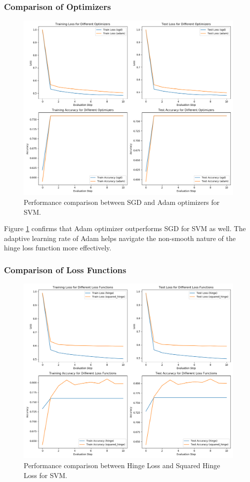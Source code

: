 \documentclass[journal, a4paper]{IEEEtran}
\begin{document}
\subsubsection{Comparison of Optimizers}
\begin{figure}[htbp]
\centering
\includegraphics[width=\linewidth]{svm_optimizers.png}
\caption{Performance comparison between SGD and Adam optimizers for SVM.}
\label{fig:svm_opt}
\end{figure}

Figure \ref{fig:svm_opt} confirms that Adam optimizer outperforms SGD for SVM as well. The adaptive learning rate of Adam helps navigate the non-smooth nature of the hinge loss function more effectively.

\subsubsection{Comparison of Loss Functions}
\begin{figure}[htbp]
\centering
\includegraphics[width=\linewidth]{svm_loss_functions.png}
\caption{Performance comparison between Hinge Loss and Squared Hinge Loss for SVM.}
\label{fig:svm_loss}
\end{figure}
\end{document}
